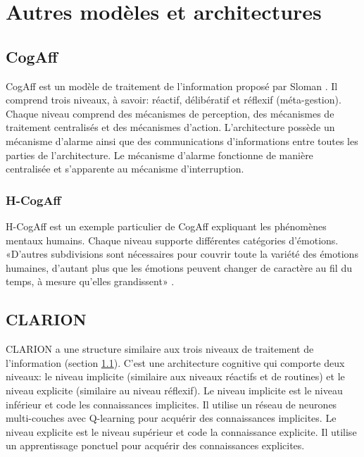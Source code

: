 
\chapter{Autres modèles et architectures} %

\label{Chapter5} %


\section{CogAff} \label{cogaff}

CogAff est un modèle de traitement de l'information proposé par Sloman \parencite{sloman2005architectural}. Il comprend trois niveaux, à savoir: réactif, délibératif et réflexif (méta-gestion). 
Chaque niveau comprend des mécanismes de perception, des mécanismes de traitement centralisés et des mécanismes d'action. L'architecture possède un mécanisme d'alarme ainsi que des communications d'informations entre toutes les parties de l'architecture. Le mécanisme d'alarme fonctionne de manière centralisée et s'apparente au mécanisme d'interruption.





\subsection{H-CogAff}

H-CogAff est un exemple particulier de CogAff expliquant les phénomènes mentaux humains. Chaque niveau supporte différentes catégories d'émotions. «D'autres subdivisions sont nécessaires pour couvrir toute la variété des émotions humaines, d'autant plus que les émotions peuvent changer de caractère au fil du temps, à mesure qu'elles grandissent» \parencite{sloman2005architectural}.


\section{CLARION}

CLARION a une structure similaire aux trois niveaux de traitement de l’information (section \ref{cogaff}). C'est une architecture cognitive qui comporte deux niveaux: le niveau implicite (similaire aux niveaux réactifs et de routines) et le niveau explicite (similaire au niveau réflexif). Le niveau implicite est le niveau inférieur et code les connaissances implicites. Il utilise un réseau de neurones multi-couches avec Q-learning \parencite{watkins1992q} pour acquérir des connaissances implicites. Le niveau explicite est le niveau supérieur et code la connaissance explicite. Il utilise un apprentissage ponctuel pour acquérir des connaissances explicites.

